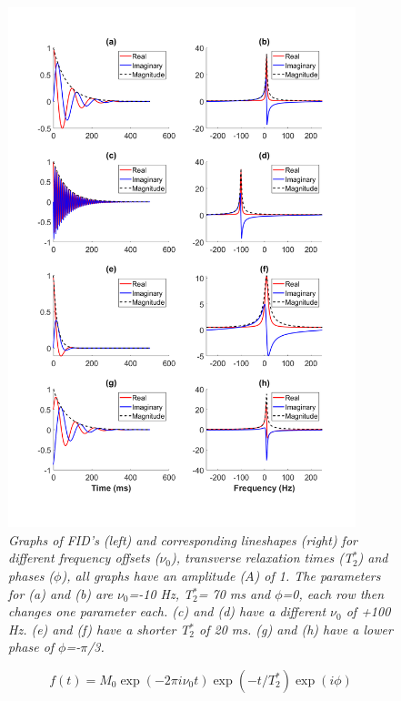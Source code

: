 \begin{figure}
    \centering
    \includegraphics[width=0.9\textwidth]{Figures/Theory/FID_Lorentz.png}
    \caption{\textit{Graphs of \ac{FID}'s (left) and corresponding lineshapes (right) for different frequency offsets ($\nu_0$), transverse relaxation times (T$_2^*$) and phases ($\phi$), all graphs have an amplitude ($A$) of 1. The parameters for (a) and (b) are $\nu_0$=-10 Hz, T$_2^*$= 70 ms and $\phi$=0, each row then changes one parameter each. (c) and (d) have a different $\nu_0$ of +100 Hz. (e) and (f) have a shorter T$_2^*$ of 20 ms. (g) and (h) have a lower phase of $\phi$=-$\pi$/3.}}
    \label{fig:theory:FID_Lorentz}
\end{figure}

\begin{equation}
    f(t) = M_0\exp(-2\pi i \nu_0t)\exp(-t/T_2^*)\exp(i\phi)
    \label{eqn:theory:euler}
\end{equation}

